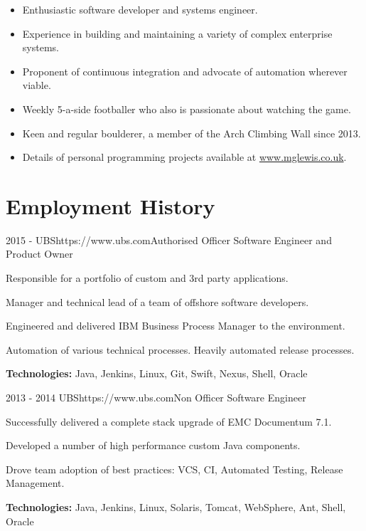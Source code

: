 \documentclass[10pt]{article}
\begin{document}
{\begin{itemize}
\setlength\itemsep{-0.2em}
\item Enthusiastic software developer and systems engineer.
\item Experience in building and maintaining a variety of complex enterprise systems.
\item Proponent of continuous integration and advocate of automation wherever viable.
\item Weekly 5-a-side footballer who also is passionate about watching the game.
\item Keen and regular boulderer, a member of the Arch Climbing Wall since 2013. 
\item Details of personal programming projects available at \href{http://www.mglewis.co.uk}{www.mglewis.co.uk}.
\end{itemize}


\section{Employment History}

\job
{2015 -}
{UBS}{https://www.ubs.com}{Authorised Officer}
{Software Engineer and Product Owner}
{\begin{itemize-noindent}
\setlength\itemsep{-0.2em}
\item Responsible for a portfolio of custom and 3rd party applications.
\item Manager and technical lead of a team of offshore software developers.
\item Engineered and delivered IBM Business Process Manager to the environment.
\item Automation of various technical processes. Heavily automated release processes.
\end{itemize-noindent}
\textbf{Technologies:} Java, Jenkins, Linux, Git, Swift, Nexus, Shell, Oracle}

\job
{2013 - 2014}
{UBS}{https://www.ubs.com}{Non Officer}
{Software Engineer}
{\begin{itemize-noindent}
\setlength\itemsep{-0.2em}
\item Successfully delivered a complete stack upgrade of EMC Documentum 7.1.
\item Developed a number of high performance custom Java components.
\item Drove team adoption of best practices: VCS, CI, Automated Testing, Release Management.
\end{itemize-noindent}
\textbf{Technologies:} Java, Jenkins, Linux, Solaris, Tomcat, WebSphere, Ant, Shell, Oracle}

}
\end{document}
